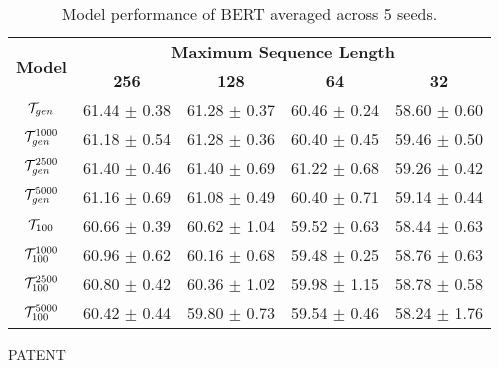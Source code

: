 \begin{table*}[t]
    \bigskip
    \begin{subtable}{\textwidth}
    \centering
        \begin{tabular}{ccccc}
            \hline
            
            \multirow{2}{*}{\textbf{Model}}         & \multicolumn{4}{c}{\textbf{Maximum Sequence Length}}  \\          
            
                                                    & \textbf{256}  & \textbf{128}   & \textbf{64}   & \textbf{32}  \\ 
            
            \hline
    
            $\mathcal{T}_{gen}$                               & 61.44 $\pm$ 0.38      & 61.28 $\pm$ 0.37      & 60.46 $\pm$ 0.24      & 58.60 $\pm$ 0.60  \\         
            $\mathcal{T}_{gen}^{1000}$                        & 61.18 $\pm$ 0.54      & 61.28 $\pm$ 0.36      & 60.40 $\pm$ 0.45      & 59.46 $\pm$ 0.50  \\ 
            $\mathcal{T}_{gen}^{2500}$                        & 61.40 $\pm$ 0.46      & 61.40 $\pm$ 0.69      & 61.22 $\pm$ 0.68      & 59.26 $\pm$ 0.42  \\ 
            $\mathcal{T}_{gen}^{5000}$                        & 61.16 $\pm$ 0.69      & 61.08 $\pm$ 0.49      & 60.40 $\pm$ 0.71      & 59.14 $\pm$ 0.44  \\ 
            $\tok100$                               & 60.66 $\pm$ 0.39      & 60.62 $\pm$ 1.04      & 59.52 $\pm$ 0.63      & 58.44 $\pm$ 0.63  \\ 
            $\tok100^{1000}$                        & 60.96 $\pm$ 0.62      & 60.16 $\pm$ 0.68      & 59.48 $\pm$ 0.25      & 58.76 $\pm$ 0.63  \\ 
            $\tok100^{2500}$                        & 60.80 $\pm$ 0.42      & 60.36 $\pm$ 1.02      & 59.98 $\pm$ 1.15      & 58.78 $\pm$ 0.58  \\ 
            $\tok100^{5000}$                        & 60.42 $\pm$ 0.44      & 59.80 $\pm$ 0.73      & 59.54 $\pm$ 0.46      & 58.24 $\pm$ 1.76  \\   
            
            \hline
        \end{tabular}
        \caption{PATENT}
    \end{subtable}

    \caption{Model performance of BERT averaged across 5 seeds.}
    \label{table:bert}
\end{table*}

